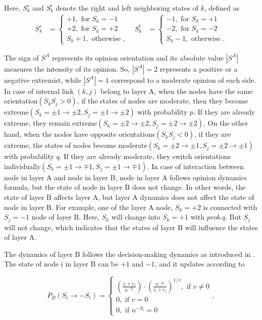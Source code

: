 Here, $S_k^r$ and $S_k^l$ denote the right and left neighboring states of $k$, defined as
\begin{align}
S_k^r &= \left\{\begin{matrix}
+1,\mbox{ for } S_k = -1\\
+2,\mbox{ for } S_k = +2\\ 
S_k + 1,\mbox{ otherwise }, 
\end{matrix}\right. &
S_k^l &= \left\{\begin{matrix}
-1,\mbox{ for } S_k= +1
\\ -2,\mbox{ for } S_k=-2
\\ S_k - 1,\mbox{ otherwise }.
\end{matrix}\right.
\end{align}

The sign of $S^A$ represents its opinion orientation and its absolute value $|S^A|$ measures the intensity of its opinion. So, $|S^A|=2$ represents a positive or a negative extremist, while  $|S^A|=1$ correspond to a moderate opinion of each side. In case of internal link $(k, j)$ belong to layer A, when the nodes have the same orientation$(S_kS_j>0)$, if the states of nodes are moderate, then they become extreme$(S_k=\pm1 \rightarrow \pm2, S_j= \pm1 \rightarrow \pm2)$ with probability $p$. If they are already extreme, they remain extreme$(S_k=\pm2 \rightarrow \pm2, S_j= \pm2 \rightarrow \pm2)$. On the other hand, when the nodes have opposite orientations$(S_kS_j<0)$, if they are extreme, the states of nodes become moderate$(S_k=\pm2 \rightarrow \pm1, S_j= \pm2 \rightarrow \pm1)$ with probability $q$. If they are already moderate, they switch orientations individually$(S_k=\pm1 \rightarrow \mp1, S_j= \pm1 \rightarrow \mp1)$.  In case of interaction between node in layer A and node in layer B, node in layer A follows opinion dynamics formula, but the state of node in layer B does not change. In other words, the state of layer B affects layer A, but layer A dynamics does not affect the state of node in layer B. For example, one of the layer A node, $S_k = +2$ is connected with  $S_j = -1$ node of layer B. Here, $S_k$ will change into $S_k = +1$ with $prob.q$. But $S_j$ will not change, which indicates that the states of layer B will influence the states of layer A.

The dynamics of layer B follows the decision-making dynamics as introduced in \cite{abrams2003, vazquez2010}. The state of node i in layer B can be $+1$ and $-1$, and it updates according to

\begin{equation}
{P_B}({S_i} \to  - {S_i}) = \begin{cases}
{\left({\displaystyle\frac{{{i_i} + {e_i}}}{{{n^{ - {S_i}}}}}}\right)}{\cdot}{\left({\displaystyle\frac{{n^{-{S_i}}}}{{{i_i} + {e_i}}}} \right)^{1/v}}  ,\mbox{ if } v \ne 0\\
0,\mbox{ if } v = 0\\
0,\mbox{ if } {n^{ - {S_i}}} = 0
\end{cases},
\end{equation}

